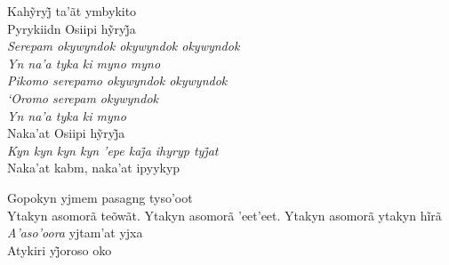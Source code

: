 \begin{linenumbers}\begingroup\raggedright
 
\noindent   Kahỹryj̃ ta’ãt ymbykito\\
  Pyrykiidn Osiipi hỹryj̃a\\
 \emph{Serepam okywyndok okywyndok okywyndok}\\
 \emph{Yn na'a tyka ki myno myno}\\
 \emph{Pikomo serepamo okywyndok okywyndok}\\
 \emph{`Oromo serepam okywyndok}\\
 \emph{Yn na'a tyka ki myno}\\
  Naka’at Osiipi hỹryj̃a\\
 \emph{Kyn kyn kyn kyn ’epe kaj̃a ihyryp tyj̃at}\\
  Naka'at kabm, naka'at ipyykyp
 
\end{linenumbers}\endgroup

\bigskip

\begin{linenumbers}\begingroup\raggedright
 
\noindent   Gopokyn yjmem pasagng tyso'oot\\
  Ytakyn asomorã teõwãt. Ytakyn asomorã ’eet’eet. Ytakyn asomorã ytakyn hĩrã\\
  \emph{A'aso'oora} yjtam'at yjxa\\
  Atykiri yj̃oroso oko
 
\end{linenumbers}\endgroup


